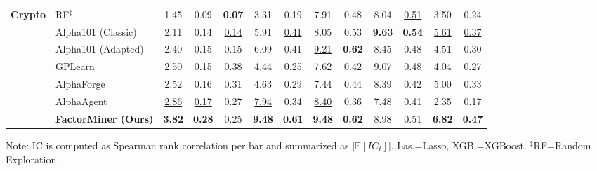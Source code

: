 \begin{table}[t]
\begin{tabular}{ll ccc cccc cccc}
    \midrule
    \multirow{7}{*}{\textbf{Crypto}}
    & RF$^\ddagger$ & 1.45 & 0.09 & \textbf{0.07} & 3.31 & 0.19 & 7.91 & 0.48 & 8.04 & \underline{0.51} & 3.50 & 0.24 \\
    & Alpha101 (Classic) & 2.11 & 0.14 & \underline{0.14} & 5.91 & \underline{0.41} & 8.05 & 0.53 & \textbf{9.63} & \textbf{0.54} & \underline{5.61} & \underline{0.37} \\
    & Alpha101 (Adapted) & 2.40 & 0.15 & 0.15 & 6.09 & 0.41 & \underline{9.21} & \textbf{0.62} & 8.45 & 0.48 & 4.51 & 0.30 \\
    & GPLearn & 2.50 & 0.15 & 0.38 & 4.44 & 0.25 & 7.62 & 0.42 & \underline{9.07} & \underline{0.48} & 4.04 & 0.27 \\
    & AlphaForge & 2.52 & 0.16 & 0.31 & 4.63 & 0.29 & 7.44 & 0.44 & 8.39 & 0.42 & 5.00 & 0.33 \\
    & AlphaAgent & \underline{2.86} & \underline{0.17} & 0.27 & \underline{7.94} & 0.34 & \underline{8.40} & 0.36 & 7.48 & 0.41 & 2.35 & 0.17 \\
    & \textbf{FactorMiner (Ours)} & \textbf{3.82} & \textbf{0.28} & 0.25 & \textbf{9.48} & \textbf{0.61} & \textbf{9.48} & \textbf{0.62} & 8.98 & 0.51 & \textbf{6.82} & \textbf{0.47} \\
    \bottomrule
  \end{tabular}
  \begin{flushleft}
    \scriptsize Note: IC is computed as Spearman rank correlation per bar and summarized as $|\mathbb{E}[IC_t]|$. Las.=Lasso, XGB.=XGBoost. $^\ddagger$RF=Random Exploration.
  \end{flushleft}
\end{table}
